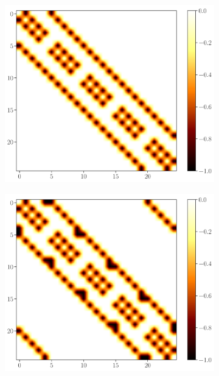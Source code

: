 \documentclass[11pt, a4paper]{article}
\theoremstyle{definition} %
\begin{document}
\begin{figure}[h]
\centering
		\begin{subfigure}[b]{0.31\textwidth}
			\includegraphics[width=\textwidth]{ColorMapMatrix_OBC_2D}
			\caption{}
		\end{subfigure}
		\begin{subfigure}[b]{0.31\textwidth}
			\includegraphics[width=\textwidth]{ColorMapMatrix_PBC_2D}
			\caption{}
		\end{subfigure}
		\begin{subfigure}[b]{0.31\textwidth}

\end{subfigure}
\end{figure}
\end{document}
